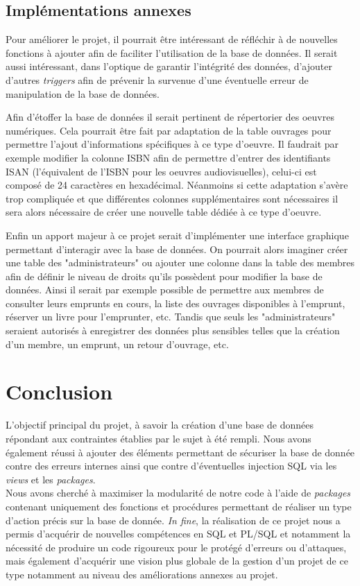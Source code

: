 \documentclass[11pt,a4paper]{article}
\begin{document}
\subsection{Implémentations annexes}
Pour améliorer le projet, il pourrait être intéressant de réfléchir à de nouvelles fonctions à ajouter afin de faciliter l'utilisation de la base de données. Il serait aussi intéressant, dans l'optique de garantir l'intégrité des données, d'ajouter d'autres \textit{triggers} afin de prévenir la survenue d'une éventuelle erreur de manipulation de la base de données.
\par
Afin d'étoffer la base de données il serait pertinent de répertorier des oeuvres numériques. Cela pourrait être fait par adaptation de la table ouvrages pour permettre l'ajout d'informations spécifiques à ce type d'oeuvre. Il faudrait par exemple modifier la colonne ISBN afin de permettre d'entrer des identifiants ISAN (l'équivalent de l'ISBN pour les oeuvres audiovisuelles), celui-ci est composé de 24 caractères en hexadécimal. Néanmoins si cette adaptation s'avère trop compliquée et que différentes colonnes supplémentaires sont nécessaires il sera alors nécessaire de créer une nouvelle table dédiée à ce type d'oeuvre.  
\par
Enfin un apport majeur à ce projet serait d'implémenter une interface graphique permettant d'interagir avec la base de données. On pourrait alors imaginer créer une table des "administrateurs" ou ajouter une colonne dans la table des membres afin de définir le niveau de droits qu'ils possèdent pour modifier la base de données. Ainsi il serait par exemple possible de permettre aux membres de consulter leurs emprunts en cours, la liste des ouvrages disponibles à l'emprunt, réserver un livre pour l'emprunter, etc.
Tandis que seuls les "administrateurs" seraient autorisés à enregistrer des données plus sensibles telles que la création d'un membre, un emprunt, un retour d'ouvrage, etc.
\section{Conclusion}
L'objectif principal du projet, à savoir la création d'une base de données répondant aux contraintes établies par le sujet à été rempli. Nous avons également réussi à ajouter des éléments permettant de sécuriser la base de donnée contre des erreurs internes ainsi que contre d'éventuelles injection SQL via les \textit{views} et les \textit{packages}.\\
Nous avons cherché à maximiser la modularité de notre code à l'aide de \textit{packages} contenant uniquement des fonctions et procédures permettant de réaliser un type d'action précis sur la base de donnée.
\textit{In fine}, la réalisation de ce projet nous a permis d'acquérir de nouvelles compétences en SQL et PL/SQL et notamment la nécessité de produire un code rigoureux pour le protégé d'erreurs ou d'attaques, mais également d'acquérir une vision plus globale de la gestion d'un projet de ce type notamment au niveau des améliorations annexes au projet.
\end{document}
